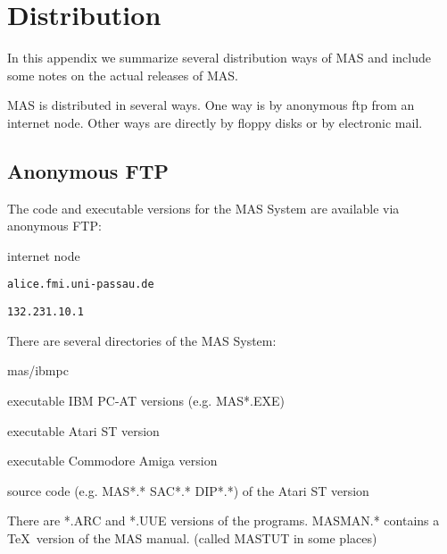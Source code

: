 
\appendix

\chapter{Distribution}

In this appendix we summarize several 
distribution ways of MAS and 
include some notes on the actual releases of MAS.

MAS is distributed in several ways. One way is 
by anonymous ftp from an internet node.
Other ways are directly by floppy disks or 
by electronic mail.

\section{Anonymous FTP}

The code and executable versions for the MAS System are
available via anonymous FTP:

\begin{deflist}{internet node}
\item[MAS site]       \verb/alice.fmi.uni-passau.de/
\item[internet node]  \verb/132.231.10.1/
\end{deflist}

There are several directories of the MAS System:

\begin{deflist}{mas/ibmpc}
\item[mas/ibmpc] executable IBM PC-AT versions (e.g. MAS*.EXE)
\item[mas/atari] executable Atari ST version
\item[mas/amiga] executable Commodore Amiga version
\item[mas/src]   source code (e.g. MAS*.* SAC*.* DIP*.*) 
                 of the Atari ST version 
\end{deflist}

There are *.ARC and *.UUE versions of the programs.
MASMAN.* contains a \TeX\ version of the MAS manual.
(called MASTUT in some places)

